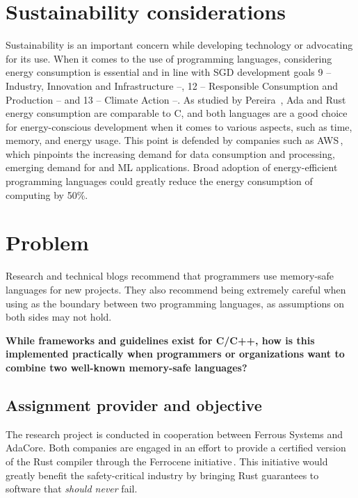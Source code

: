 \documentclass[nomenclature, english, bibtex]{kththesis}
\begin{document}
\section{Sustainability considerations}

Sustainability is an important concern while developing technology or advocating for its use. When it comes to the use of programming languages, considering energy consumption is essential and in line with SGD development goals 9 -- Industry, Innovation and Infrastructure --, 12 -- Responsible Consumption and Production -- and 13 -- Climate Action --\cite{noauthor_envision2030_nodate}. As studied by Pereira \etal\,\cite{pereira_energy_2017}, Ada and Rust energy consumption are comparable to C, and both languages are a good choice for energy-conscious development when it comes to various aspects, such as time, memory, and energy usage. This point is defended by companies such as AWS\,\cite{miller_sustainability_2022}, which pinpoints the increasing demand for data consumption and processing, emerging demand for  and ML applications. Broad adoption of energy-efficient programming languages could greatly reduce the energy consumption of computing by 50\%\cite{miller_sustainability_2022}.

\section{Problem}
\label{sec:problem}

Research and technical blogs recommend that programmers use memory-safe languages for new projects. They also recommend being extremely careful when using  as the boundary between two programming languages, as assumptions on both sides may not hold. 

\textbf{While frameworks and guidelines exist for C/C++, how is this implemented practically when programmers or organizations want to combine two well-known memory-safe languages?}

\subsection{Assignment provider and objective}

The research project is conducted in cooperation between Ferrous Systems and AdaCore. Both companies are engaged in an effort to provide a certified version of the Rust compiler through the Ferrocene initiative\,\cite{noauthor_ferrocene_2023}. This initiative would greatly benefit the \gls{safety-critical} industry by bringing Rust guarantees to software that \emph{should never} fail.
\end{document}
